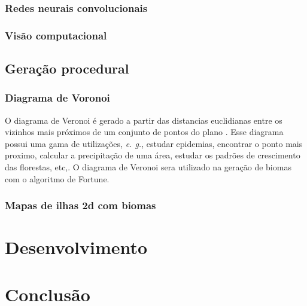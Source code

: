 \documentclass[
	12pt,				%
	openright,			%
	twoside,			%
	a4paper,			%
	english,			%
	french,				%
	spanish,			%
	brazil				%
	]{abntex2}
\begin{document}
\subsection{Redes neurais convolucionais}

\subsection{Visão computacional}

\section{Geração procedural}
\subsection{Diagrama de Voronoi}

O diagrama de Veronoi é gerado a partir das distancias euclidianas entre os vizinhos mais próximos de um conjunto de pontos do plano\space
\cite{diagrama_de_voronoi:_uma_exploracao_nas_distancias_euclidiana_e_do_taxi}. Esse diagrama possui uma gama de utilizações, \emph{e. g.}, estudar epidemias, encontrar o 
ponto mais proximo, calcular a precipitação de uma área, estudar os padrões de crescimento das florestas, etc,\space\cite{poligonos_de_thiessen_ou_voronoi}. O diagrama de 
Veronoi sera utilizado na geração de biomas com o algoritmo de Fortune.


\subsection{Mapas de ilhas 2d com biomas}

\chapter{Desenvolvimento}


\chapter*[Conclusão]{Conclusão}
\end{document}
